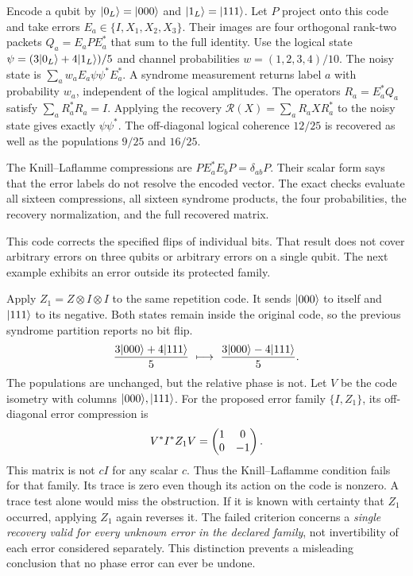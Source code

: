 Encode a qubit by $\lvert 0_L\rangle=\lvert 000\rangle$ and $\lvert 1_L\rangle=\lvert 111\rangle$. Let $P$ project onto this code and take errors $E_a\in\{I,X_1,X_2,X_3\}$. Their images are four orthogonal rank-two packets $Q_a=E_aPE_a^*$ that sum to the full identity.
Use the logical state $\psi=(3\lvert 0_L\rangle+4\lvert 1_L\rangle)/5$ and channel probabilities $w=(1,2,3,4)/10$. The noisy state is $\sum_aw_aE_a\psi\psi^*E_a^*$. A syndrome measurement returns label $a$ with probability $w_a$, independent of the logical amplitudes.
The operators $R_a=E_a^*Q_a$ satisfy $\sum_aR_a^*R_a=I$. Applying the recovery $\mathcal R(X)=\sum_aR_aXR_a^*$ to the noisy state gives exactly $\psi\psi^*$. The off-diagonal logical coherence $12/25$ is recovered as well as the populations $9/25$ and $16/25$.

The Knill--Laflamme compressions are $PE_a^*E_bP=\delta_{ab}P$. Their scalar form says that the error labels do not resolve the encoded vector. The exact checks evaluate all sixteen compressions, all sixteen syndrome products, the four probabilities, the recovery normalization, and the full recovered matrix.

This code corrects the specified flips of individual bits. That result does not cover arbitrary errors on three qubits or arbitrary errors on a single qubit. The next example exhibits an error outside its protected family.

Apply $Z_1=Z\otimes I\otimes I$ to the same repetition code. It sends $\lvert 000\rangle$ to itself and $\lvert 111\rangle$ to its negative. Both states remain inside the original code, so the previous syndrome partition reports no bit flip.
\[
\frac{3\lvert 000\rangle+4\lvert 111\rangle}5
\ \longmapsto\
\frac{3\lvert 000\rangle-4\lvert 111\rangle}5.
\]
The populations are unchanged, but the relative phase is not.
Let $V$ be the code isometry with columns $\lvert 000\rangle,\lvert 111\rangle$. For the proposed error family $\{I,Z_1\}$, its off-diagonal error compression is
\[
V^*I^*Z_1V=\begin{pmatrix}1&0\\0&-1\end{pmatrix}.
\]
This matrix is not $cI$ for any scalar $c$. Thus the Knill--Laflamme condition fails for that family. Its trace is zero even though its action on the code is nonzero. A trace test alone would miss the obstruction.
\head{Known correction versus family recovery}
If it is known with certainty that $Z_1$ occurred, applying $Z_1$ again reverses it. The failed criterion concerns a \emph{single recovery valid for every unknown error in the declared family}, not invertibility of each error considered separately. This distinction prevents a misleading conclusion that no phase error can ever be undone.

